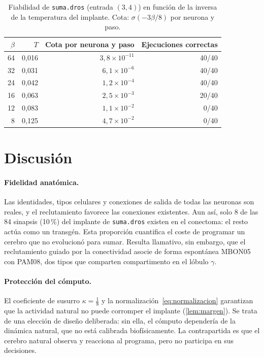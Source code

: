 \documentclass[11pt,a4paper]{article}
\theoremstyle{plain}
\theoremstyle{definition}
\theoremstyle{remark}
\newcommand{\sig}{\sigma}
\begin{document}
\begin{table}[t]
\centering
\caption{Fiabilidad de \texttt{suma.dros} (entrada $(3,4)$) en función de la
inversa de la temperatura del implante. Cota: $\sig(-3\beta/8)$ por neurona y
paso.}
\label{tab:temperatura}
\small
\begin{tabular}{@{}rrrr@{}}
\toprule
$\beta$ & $T$ & Cota por neurona y paso & Ejecuciones correctas \\
\midrule
64 & 0,016 & $3{,}8\times10^{-11}$ & 40/40 \\
32 & 0,031 & $6{,}1\times10^{-6}$  & 40/40 \\
24 & 0,042 & $1{,}2\times10^{-4}$  & 40/40 \\
16 & 0,063 & $2{,}5\times10^{-3}$  & 20/40 \\
12 & 0,083 & $1{,}1\times10^{-2}$  & 0/40 \\
 8 & 0,125 & $4{,}7\times10^{-2}$  & 0/40 \\
\bottomrule
\end{tabular}
\end{table}

\section{Discusión}
\label{sec:discusion}

\paragraph{Fidelidad anatómica.} Las identidades, tipos celulares y
conexiones de salida de todas las neuronas son reales, y el reclutamiento
favorece las conexiones existentes. Aun así, solo 8 de las 84 sinapsis (10\,\%)
del implante de \texttt{suma.dros} existen en el conectoma: el resto actúa
como un transgén. Esta proporción cuantifica el coste de programar un
cerebro que no evolucionó para sumar. Resulta llamativo, sin embargo, que el
reclutamiento guiado por la conectividad asocie de forma espontánea MBON05
con PAM08, dos tipos que comparten compartimento en el lóbulo $\gamma$.

\paragraph{Protección del cómputo.} El coeficiente de susurro $\kappa=\tfrac18$
y la normalización~\eqref{eq:normalizacion} garantizan que la actividad
natural no puede corromper el implante (\cref{lem:margen}). Se trata de una
elección de diseño deliberada: sin ella, el cómputo dependería de la
dinámica natural, que no está calibrada biofísicamente. La contrapartida es
que el cerebro natural observa y reacciona al programa, pero no participa en
sus decisiones.
\end{document}
